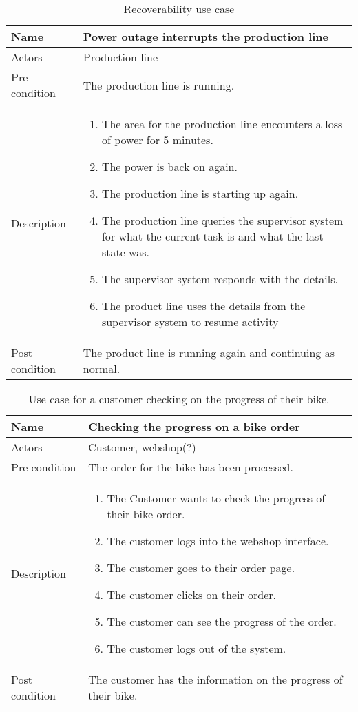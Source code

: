 \begin{table}[h]
\caption{Recoverability use case}
\centering
\begin{tabular}{|l|p{8cm}|} \hline
Name & Power outage interrupts the production line \\ \hline
Actors & Production line \\ \hline
Pre condition & The production line is running.  \\ \hline
Description & \begin{enumerate} 
\item The area for the production line encounters a loss of power for 5 minutes.
\item The power is back on again.
\item The production line is starting up again.
\item The production line queries the supervisor system for what the current task is and what the last state was.
\item The supervisor system responds with the details.
\item The product line uses the details from the supervisor system to resume activity
\end{enumerate} \\ \hline
Post condition & The product line is running again and continuing as normal. \\
\hline
\end{tabular}
\end{table}


\begin{table}[h]
\caption{Use case for a customer checking on the progress of their bike.}
\centering
\begin{tabular}{|l|p{8cm}|} \hline
Name & Checking the progress on a bike order\\ \hline
Actors & Customer, webshop(?) \\ \hline
Pre condition & The order for the bike has been processed.  \\ \hline
Description & \begin{enumerate} 
    \item The Customer wants to check the progress of their bike order.
    \item The customer logs into the webshop interface.
    \item The customer goes to their order page.
    \item The customer clicks on their order.
    \item The customer can see the progress of the order.
    \item The customer logs out of the system.
\end{enumerate} \\ \hline
Post condition & The customer has the information on the progress of their bike. \\
\hline
\end{tabular}
\end{table}
